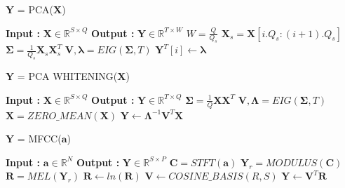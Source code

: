\begin{algorithm}
  \caption{$\textbf{Y}$ = PCA($\textbf{X}$)}\label{PCA}
  \begin{algorithmic}[1]
    \Statex \textbf{Input :} $\textbf{X} \in \mathbb{R}^{S \times Q}$
    \Statex \textbf{Output :} $\textbf{Y} \in \mathbb{R}^{T \times W}$
    \State  $W = \frac{Q}{Q_{s}}$
    \State $\textbf{X}_{s} = \textbf{X}[i.Q_{s}:(i+1).Q_{s}]$ 
      \State $\bm{\Sigma} = \frac{1}{Q_{s}}\textbf{X}_{s}\textbf{X}_{s}^{T}$ 
      \State $\textbf{V}, \bm{\lambda} = EIG(\bm{\Sigma}, T)$ 
      \State $\textbf{Y}^{T}[i] \leftarrow \bm{\lambda}$
    \EndFor
  \end{algorithmic}
\end{algorithm}
\bigskip


\begin{algorithm}
  \caption{$\textbf{Y}$ = PCA WHITENING($\textbf{X}$) }\label{PCA_W}
  \begin{algorithmic}[1]
    \Statex \textbf{Input :} $\textbf{X} \in \mathbb{R}^{S \times Q}$
    \Statex \textbf{Output :} $\textbf{Y} \in \mathbb{R}^{T \times Q}$ 
      \State $\bm{\Sigma} = \frac{1}{Q}\textbf{X}\textbf{X}^{T}$ 
      \State $\textbf{V}, \bm{\Lambda} = EIG(\bm{\Sigma}, T)$ 
      \State $\textbf{\^{X}} = ZERO\_MEAN(\textbf{X})$
      \State $\textbf{Y} \leftarrow \bm{\Lambda}^{-1}\textbf{V}^{T}\textbf{\^{X}}$
  \end{algorithmic}
\end{algorithm}
\bigskip


\begin{algorithm}
  \caption{$\textbf{Y}$ = MFCC($\textbf{a}$) }\label{MFCC}
  \begin{algorithmic}[1]
    \Statex \textbf{Input :} $\textbf{a} \in \mathbb{R}^{N}$
    \Statex \textbf{Output :} $\textbf{Y} \in \mathbb{R}^{S \times P}$ 
    \State $\textbf{C} = STFT(\textbf{a})$ 
    \State $\textbf{Y}_{r} = MODULUS(\textbf{C})$ 
    \State $\textbf{R} = MEL(\textbf{Y}_{r})$ 
    \State $\textbf{R} \leftarrow ln(\textbf{R})$
    \State $\textbf{V} \leftarrow COSINE\_BASIS(R,S)$  
    \State $\textbf{Y} \leftarrow \textbf{V}^{T}\textbf{R}$
  \end{algorithmic}
\end{algorithm}
 
